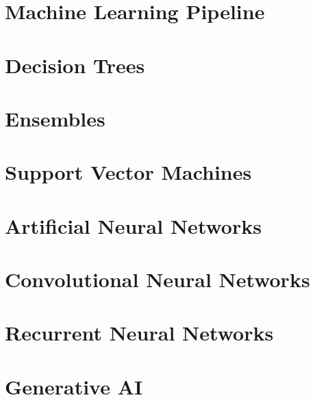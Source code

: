\documentclass[
]{book}
\begin{document}
\hypertarget{ml-pipeline}{%
\chapter{Machine Learning Pipeline}\label{ml-pipeline}}

\hypertarget{trees}{%
\chapter{Decision Trees}\label{trees}}

\hypertarget{ensembles}{%
\chapter{Ensembles}\label{ensembles}}

\hypertarget{svm}{%
\chapter{Support Vector Machines}\label{svm}}

\hypertarget{ann}{%
\chapter{Artificial Neural Networks}\label{ann}}

\hypertarget{cnn}{%
\chapter{Convolutional Neural Networks}\label{cnn}}

\hypertarget{rnn}{%
\chapter{Recurrent Neural Networks}\label{rnn}}

\hypertarget{gen-AI}{%
\chapter{Generative AI}\label{gen-AI}}

  
\end{document}
